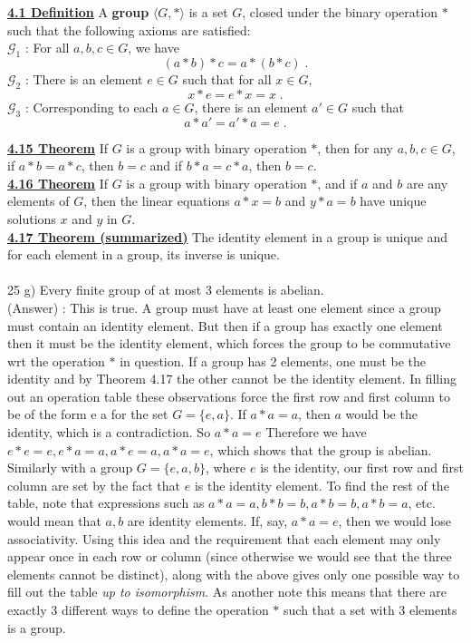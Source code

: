 \documentclass[12pt, letterpaper]{article}
\begin{document}
\noindent \underline{\bf 4.1 Definition} A {\bf group} $\langle G, * \rangle$ is a set $G$, closed under the binary operation $*$ such that the following axioms are satisfied: \\

\noindent $\mathscr{G}_1$ : For all $a,b,c \in G$, we have $$(a*b)*c = a*(b*c)\;.$$
$\mathscr{G}_2$ : There is an element $e \in G$ such that for all $x \in G$, $$x*e = e*x = x\;.$$
$\mathscr{G}_3$ : Corresponding to each $a \in G$, there is an element $a' \in G$ such that $$a*a' = a'*a = e\;.$$

\noindent \underline{\bf 4.15 Theorem} If $G$ is a group with binary operation $*$, then for any $a,b,c \in G$, if $a*b = a*c$, then $b=c$ and if $b*a = c*a$, then $b = c$.\\

\noindent \underline{\bf 4.16 Theorem} If $G$ is a group with binary operation $*$, and if $a$ and $b$ are any elements of $G$, then the linear equations $a * x = b$ and $y * a = b$ have unique solutions $x$ and $y$ in $G$.\\

\noindent \underline{\bf 4.17 Theorem (summarized)} The identity element in a group is unique and for each element in a group, its inverse is unique. \\

 \\

25 g) Every finite group of at most 3 elements is abelian.\\

(Answer) : This is true. A group must have at least one element since a group must contain an identity element. But then if a group has exactly one element then it must be the identity element, which forces the group to be commutative wrt the operation $*$ in question. If a group has 2 elements, one must be the identity and by Theorem 4.17 the other cannot be the identity element. In filling out an operation table these observations force the first row and first column to be of the form e a for the set $G = \{e, a\}$. If $a*a = a$, then $a$ would be the identity, which is a contradiction. So $a*a = e$ Therefore we have $e*e = e, e*a = a, a*e = a, a*a =e$, which shows that the group is abelian. Similarly with a group $G = \{e, a, b\}$, where $e$ is the identity, our first row and first column are set by the fact that $e$ is the identity element. To find the rest of the table, note that expressions such as $a*a = a, b*b = b, a*b = b, a*b = a$, etc. would mean that $a,b$ are identity elements. If, say, $a*a = e$, then we would lose associativity. Using this idea and the requirement that each element may only appear once in each row or column (since otherwise we would see that the three elements cannot be distinct), along with the above gives only one possible way to fill out the table \textit{up to isomorphism}. As another note this means that there are exactly 3 different ways to define the operation $*$ such that a set with 3 elements is a group.
\end{document}
